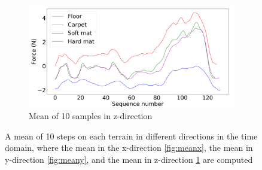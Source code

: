 \documentclass[USenglish]{ifimaster}  %
\begin{document}
\begin{figure}[h] \ContinuedFloat
	\begin{subfigure}[b]{0.95\textwidth}
		\includegraphics[width=\textwidth,height=\textheight,keepaspectratio]{Figures/z}
		\caption{Mean of 10 samples in z-direction}
		\label{fig:meanz}
	\end{subfigure}
	
	\caption[Example of the mean of each terrain for each direction in the time domain]{
		A mean of 10 steps on each terrain in different directions in the time domain, where the mean in the x-direction \ref{fig:meanx}, the mean in y-direction \ref{fig:meany}, and the mean in z-direction \ref{fig:meanz} are computed}
	\label{fig:meanxyz}
\end{figure}
\end{document}
